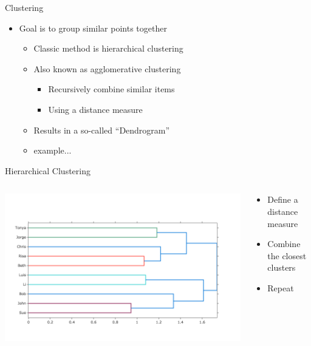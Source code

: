 \documentclass[aspectratio=169]{beamer}
\begin{document}
\begin{frame}{Clustering}

\begin{itemize}
\item Goal is to group similar points together
\begin{itemize}
\item Classic method is hierarchical clustering

\item Also known as agglomerative clustering
\begin{itemize}
\item Recursively combine similar items
\item Using a distance measure
\end{itemize}\item Results in a so-called ``Dendrogram''
\item example...
\end{itemize}
\end{itemize}

\end{frame}
\begin{frame}{Hierarchical Clustering}

\begin{columns}
\begin{column}{0.5\textwidth}
\includegraphics[width=1\textwidth]{./lectUL/dendrogram.png}
\end{column}
\begin{column}{0.5\textwidth}
\begin{itemize}
\item Define a distance measure
\item Combine the closest clusters
\item Repeat
\end{itemize}
\end{column}
\end{columns}

\end{frame}
\end{document}
